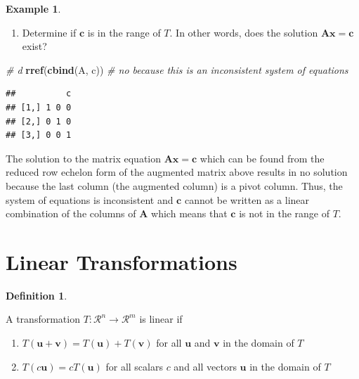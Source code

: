 \documentclass[
]{book}
\newenvironment{Shaded}{\begin{snugshade}}{\end{snugshade}}
\newcommand{\CommentTok}[1]{\textcolor[rgb]{0.56,0.35,0.01}{\textit{#1}}}
\newcommand{\KeywordTok}[1]{\textcolor[rgb]{0.13,0.29,0.53}{\textbf{#1}}}
\newcommand{\NormalTok}[1]{#1}
\providecommand{\tightlist}{%
  \setlength{\itemsep}{0pt}\setlength{\parskip}{0pt}}
\theoremstyle{definition}
\newtheorem{definition}{Definition}[chapter]
\theoremstyle{definition}
\newtheorem{example}{Example}[chapter]
\theoremstyle{definition}
\theoremstyle{remark}
\begin{document}
\begin{example}
\begin{enumerate}
\def\labelenumi{\alph{enumi})}
\setcounter{enumi}{3}
\tightlist
\item
  Determine if \(\mathbf{c}\) is in the range of \(T\). In other words, does the solution \(\mathbf{A} \mathbf{x}= \mathbf{c}\) exist?
\end{enumerate}

\begin{Shaded}
\begin{Highlighting}[]
\CommentTok{# d}
\KeywordTok{rref}\NormalTok{(}\KeywordTok{cbind}\NormalTok{(A, c)) }\CommentTok{# no because this is an inconsistent system of equations}
\end{Highlighting}
\end{Shaded}

\begin{verbatim}
##          c
## [1,] 1 0 0
## [2,] 0 1 0
## [3,] 0 0 1
\end{verbatim}

The solution to the matrix equation \(\mathbf{A} \mathbf{x} = \mathbf{c}\) which can be found from the reduced row echelon form of the augmented matrix above results in no solution because the last column (the augmented column) is a pivot column. Thus, the system of equations is inconsistent and \(\mathbf{c}\) cannot be written as a linear combination of the columns of \(\mathbf{A}\) which means that \(\mathbf{c}\) is not in the range of \(T\).

\end{example}

\hypertarget{linear-transformations-1}{%
\section{Linear Transformations}\label{linear-transformations-1}}

\begin{definition}
\protect\hypertarget{def:unlabeled-div-70}{}\label{def:unlabeled-div-70}

A transformation \(T:\mathcal{R}^n \rightarrow \mathcal{R}^m\) is linear if

\begin{enumerate}
\def\labelenumi{\arabic{enumi})}
\item
  \(T(\mathbf{u} + \mathbf{v}) = T(\mathbf{u}) + T(\mathbf{v})\) for all \(\mathbf{u}\) and \(\mathbf{v}\) in the domain of \(T\)
\item
  \(T(c \mathbf{u}) = c T(\mathbf{u})\) for all scalars \(c\) and all vectors \(\mathbf{u}\) in the domain of \(T\)
\end{enumerate}

\end{definition}
\end{document}
